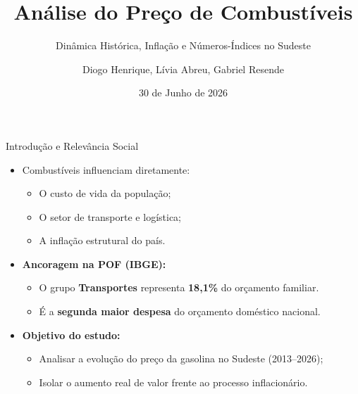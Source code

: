 \documentclass{beamer}
\title{Análise do Preço de Combustíveis}
\subtitle{Dinâmica Histórica, Inflação e Números-Índices no Sudeste}
\author{Diogo Henrique, Lívia Abreu, Gabriel Resende}
\institute{Universidade Federal de Viçosa \\ EST 100 -- Estatística Descritiva e Exploratória}
\date{30 de Junho de 2026}
\begin{document}
\frame{\titlepage}


\begin{frame}{Introdução e Relevância Social}
\begin{itemize}
    \item Combustíveis influenciam diretamente:
    \begin{itemize}
        \item O custo de vida da população;
        \item O setor de transporte e logística;
        \item A inflação estrutural do país.
    \end{itemize}
    \vspace{0.3cm}
    \item \textbf{Ancoragem na POF (IBGE):}
    \begin{itemize}
        \item O grupo \textbf{Transportes} representa \textbf{18,1\%} do orçamento familiar.
        \item É a \textbf{segunda maior despesa} do orçamento doméstico nacional.
    \end{itemize}
    \vspace{0.3cm}
    \item \textbf{Objetivo do estudo:}
    \begin{itemize}
        \item Analisar a evolução do preço da gasolina no Sudeste (2013--2026);
        \item Isolar o aumento real de valor frente ao processo inflacionário.
    \end{itemize}
\end{itemize}
\end{frame}
\end{document}
